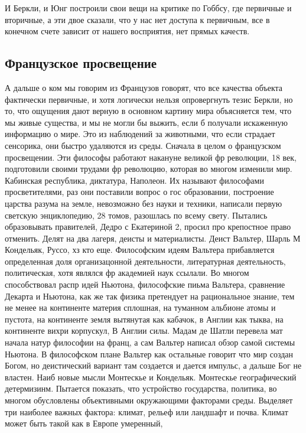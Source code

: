\documentclass[a4paper, 12pt]{article}
\begin{document}
И Беркли, и Юнг построили свои вещи на критике по Гоббсу, где первичные 
и вторичные, а эти двое сказали, что у нас нет доступа к первичным, все 
в конечном счете зависит от нашего восприятия, нет прямых качеств.

\subsection{Французское просвещение}

А дальше о ком мы говорим из Французов говорят, что все качества объекта 
фактически первичные, и хотя логически нельзя опровергнуть тезис Беркли, 
но то, что ощущения дают верную в основном картину мира объясняется тем, 
что мы живые существа, и мы не могли бы выжить, если б получали 
искаженную информацию о мире. Это из наблюдений за животными, что если 
страдает сенсорика, они быстро удаляются из среды. Сначала в целом 
о французском просвещении. Эти философы работают накануне великой фр 
революции, 18 век, подготовили своими трудами фр революцию, которая во 
многом изменили мир. Кабинская республика, диктатура, Наполеон. Их 
называют философами просветителями, раз они поставили вопрос о гос 
образовании, построение царства разума на земле, невозможно без науки 
и техники, написали первую светскую энциклопедию, 28 томов, разошлась по 
всему свету. Пытались образовывать правителей, Дедро с Екатериной 2, 
просил про крепостное право отменить. Делят на два лагеря, деисты 
и материалисты. Деист Вальтер, Шарль М Кондельяк, Руссо, хз кто еще. 
Философским идеям Вальтера прибавляется определенная доля организацонной 
деятельности, литературная деятельность, политическая, хотя являлся фр 
академией наук ссылали. Во многом способствовал распр идей Ньютона, 
философские пиьма Вальтера, сравнение Декарта и Ньютона, как же так 
физика претендует на рациональное знание, тем не менее на континенте 
материя сплошная, на туманном альбионе атомы и пустота, на континенте 
земля вытянутая как кабачок, в Англии как тыква, на континенте вихри 
корпускул, В Англии силы. Мадам де Шатли перевела мат начала натур 
философии на франц, а сам Вальтер написал обзор самой системы Ньютона. 
В философском плане Вальтер как остальные говорит что мир создан Богом, 
но деистический вариант там создается и дается импульс, а дальше Бог не 
властен. Наиб новые мысли Монтескье и Кондельяк. Монтескье 
географический детермизинм. Пытается показать, что устройство 
государства, политика, во многом обусловлены объективными окружающими 
факторами среды. Выделяет три наиболее важных фактора: климат, рельеф 
или ландшафт и почва. Климат может быть такой как в Европе умеренный, 
\end{document}
